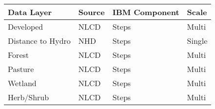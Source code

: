 \begin{tabular}{llll}
  \hline
Data Layer & Source & IBM Component & Scale \\ 
  \hline
Developed & NLCD & Steps & Multi \\ 
  Distance to Hydro & NHD & Steps & Single \\ 
  Forest & NLCD & Steps & Multi \\ 
  Pasture & NLCD & Steps & Multi \\ 
  Wetland & NLCD & Steps & Multi \\ 
  Herb/Shrub & NLCD & Steps & Multi \\ 
   \hline
\end{tabular}
